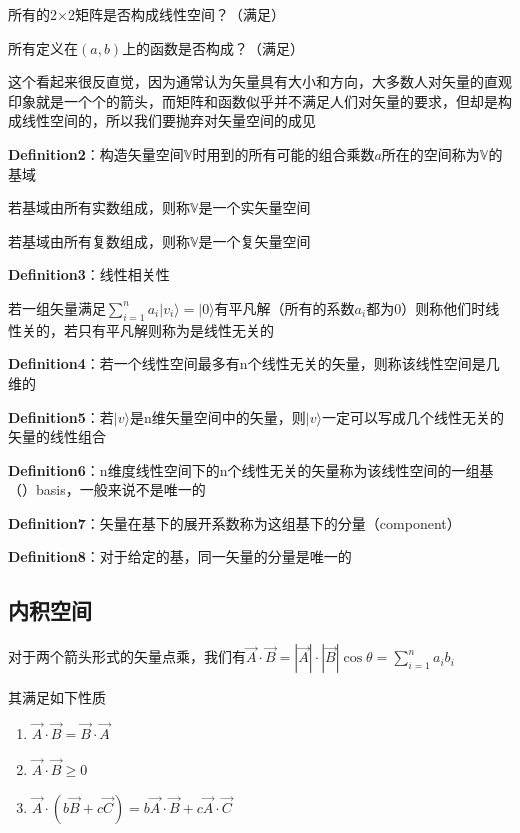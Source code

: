 \documentclass[lang=cn,10pt]{elegantbook}
\begin{document}
所有的2$\times$2矩阵是否构成线性空间？（满足）

所有定义在$(a,b) $上的函数是否构成？（满足）

这个看起来很反直觉，因为通常认为矢量具有大小和方向，大多数人对矢量的直观印象就是一个个的箭头，而矩阵和函数似乎并不满足人们对矢量的要求，但却是构成线性空间的，所以我们要抛弃对矢量空间的成见

\textbf{Definition2}：构造矢量空间$\mathbb{V}$时用到的所有可能的组合乘数$a$所在的空间称为$\mathbb{V}$的基域

若基域由所有实数组成，则称$\mathbb{V}$是一个实矢量空间

若基域由所有复数组成，则称$\mathbb{V}$是一个复矢量空间

\textbf{Definition3}：线性相关性

若一组矢量满足$\sum_{i=1}^n{a_i|v_i\rangle =|0\rangle}$有平凡解（所有的系数$a_i$都为0）则称他们时线性关的，若只有平凡解则称为是线性无关的

\textbf{Definition4}：若一个线性空间最多有n个线性无关的矢量，则称该线性空间是几维的

 \textbf{Definition5}：若$|v\rangle$是n维矢量空间中的矢量，则$|v\rangle$一定可以写成几个线性无关的矢量的线性组合
 
\textbf{Definition6}：n维度线性空间下的n个线性无关的矢量称为该线性空间的一组基（）basis，一般来说不是唯一的

\textbf{Definition7}：矢量在基下的展开系数称为这组基下的分量（component）

\textbf{Definition8}：对于给定的基，同一矢量的分量是唯一的
\subsection{内积空间}

对于两个箭头形式的矢量点乘，我们有$\overrightarrow{A}\cdot \overrightarrow{B}=|\overrightarrow{A}|\cdot |\overrightarrow{B}|\cos \theta =\sum_{i=1}^n{a_ib_i}
$

其满足如下性质
\begin{enumerate}
	\item $\overrightarrow{A}\cdot \overrightarrow{B}=\overrightarrow{B}\cdot \overrightarrow{A}$
	\item $\overrightarrow{A}\cdot \overrightarrow{B}\ge 0$
	\item $\overrightarrow{A}\cdot \left( b\overrightarrow{B}+c\overrightarrow{C} \right) =b\overrightarrow{A}\cdot \overrightarrow{B}+c\overrightarrow{A}\cdot \overrightarrow{C}
	$
\end{enumerate}
\end{document}
